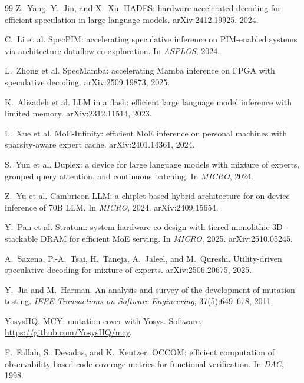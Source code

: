 \documentclass[11pt]{article}
\begin{document}
\begin{thebibliography}{99}
Z.~Yang, Y.~Jin, and X.~Xu.
\newblock HADES: hardware accelerated decoding for efficient speculation in
large language models.
\newblock arXiv:2412.19925, 2024.

C.~Li et al.
\newblock SpecPIM: accelerating speculative inference on PIM-enabled systems
via architecture-dataflow co-exploration.
\newblock In \emph{ASPLOS}, 2024.

L.~Zhong et al.
\newblock SpecMamba: accelerating Mamba inference on FPGA with speculative
decoding.
\newblock arXiv:2509.19873, 2025.

K.~Alizadeh et al.
\newblock LLM in a flash: efficient large language model inference with limited
memory.
\newblock arXiv:2312.11514, 2023.

L.~Xue et al.
\newblock MoE-Infinity: efficient MoE inference on personal machines with
sparsity-aware expert cache.
\newblock arXiv:2401.14361, 2024.

S.~Yun et al.
\newblock Duplex: a device for large language models with mixture of experts,
grouped query attention, and continuous batching.
\newblock In \emph{MICRO}, 2024.

Z.~Yu et al.
\newblock Cambricon-LLM: a chiplet-based hybrid architecture for on-device
inference of 70B LLM.
\newblock In \emph{MICRO}, 2024. arXiv:2409.15654.

Y.~Pan et al.
\newblock Stratum: system-hardware co-design with tiered monolithic
3D-stackable DRAM for efficient MoE serving.
\newblock In \emph{MICRO}, 2025. arXiv:2510.05245.

A.~Saxena, P.-A.~Tsai, H.~Taneja, A.~Jaleel, and M.~Qureshi.
\newblock Utility-driven speculative decoding for mixture-of-experts.
\newblock arXiv:2506.20675, 2025.

Y.~Jia and M.~Harman.
\newblock An analysis and survey of the development of mutation testing.
\newblock \emph{IEEE Transactions on Software Engineering}, 37(5):649--678,
2011.

YosysHQ.
\newblock MCY: mutation cover with Yosys.
\newblock Software, \url{https://github.com/YosysHQ/mcy}.

F.~Fallah, S.~Devadas, and K.~Keutzer.
\newblock OCCOM: efficient computation of observability-based code coverage
metrics for functional verification.
\newblock In \emph{DAC}, 1998.

\end{thebibliography}
\end{document}
